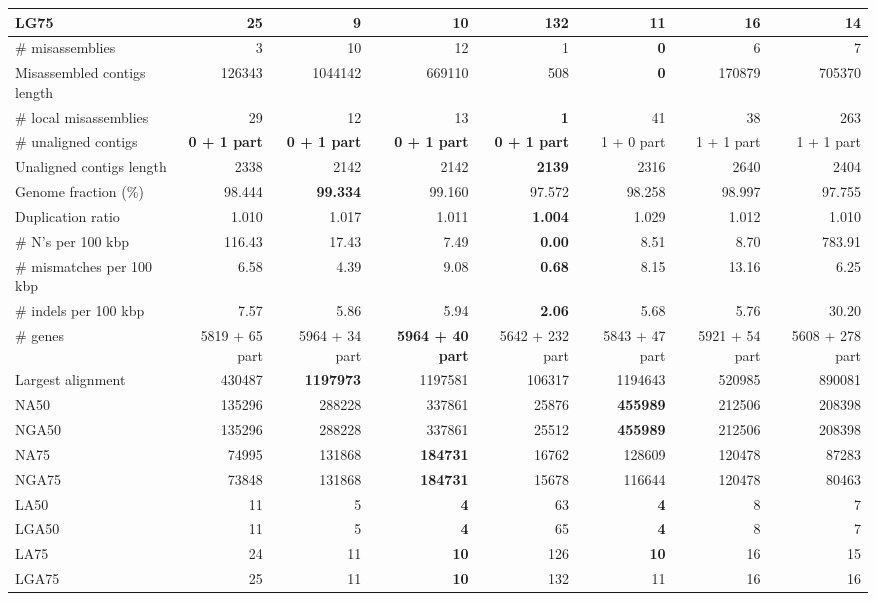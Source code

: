 \documentclass[12pt,a4paper]{article}
\begin{document}
\begin{table}[ht]
\begin{center}
\begin{tabular}{|l*{7}{|r}|}
LG75 & 25 & {\bf 9} & 10 & 132 & 11 & 16 & 14 \\ \hline
\# misassemblies & 3 & 10 & 12 & 1 & {\bf 0} & 6 & 7 \\ \hline
Misassembled contigs length & 126343 & 1044142 & 669110 & 508 & {\bf 0} & 170879 & 705370 \\ \hline
\# local misassemblies & 29 & 12 & 13 & {\bf 1} & 41 & 38 & 263 \\ \hline
\# unaligned contigs & {\bf 0 + 1 part} & {\bf 0 + 1 part} & {\bf 0 + 1 part} & {\bf 0 + 1 part} & 1 + 0 part & 1 + 1 part & 1 + 1 part \\ \hline
Unaligned contigs length & 2338 & 2142 & 2142 & {\bf 2139} & 2316 & 2640 & 2404 \\ \hline
Genome fraction (\%) & 98.444 & {\bf 99.334} & 99.160 & 97.572 & 98.258 & 98.997 & 97.755 \\ \hline
Duplication ratio & 1.010 & 1.017 & 1.011 & {\bf 1.004} & 1.029 & 1.012 & 1.010 \\ \hline
\# N's per 100 kbp & 116.43 & 17.43 & 7.49 & {\bf 0.00} & 8.51 & 8.70 & 783.91 \\ \hline
\# mismatches per 100 kbp & 6.58 & 4.39 & 9.08 & {\bf 0.68} & 8.15 & 13.16 & 6.25 \\ \hline
\# indels per 100 kbp & 7.57 & 5.86 & 5.94 & {\bf 2.06} & 5.68 & 5.76 & 30.20 \\ \hline
\# genes & 5819 + 65 part & 5964 + 34 part & {\bf 5964 + 40 part} & 5642 + 232 part & 5843 + 47 part & 5921 + 54 part & 5608 + 278 part \\ \hline
Largest alignment & 430487 & {\bf 1197973} & 1197581 & 106317 & 1194643 & 520985 & 890081 \\ \hline
NA50 & 135296 & 288228 & 337861 & 25876 & {\bf 455989} & 212506 & 208398 \\ \hline
NGA50 & 135296 & 288228 & 337861 & 25512 & {\bf 455989} & 212506 & 208398 \\ \hline
NA75 & 74995 & 131868 & {\bf 184731} & 16762 & 128609 & 120478 & 87283 \\ \hline
NGA75 & 73848 & 131868 & {\bf 184731} & 15678 & 116644 & 120478 & 80463 \\ \hline
LA50 & 11 & 5 & {\bf 4} & 63 & {\bf 4} & 8 & 7 \\ \hline
LGA50 & 11 & 5 & {\bf 4} & 65 & {\bf 4} & 8 & 7 \\ \hline
LA75 & 24 & 11 & {\bf 10} & 126 & {\bf 10} & 16 & 15 \\ \hline
LGA75 & 25 & 11 & {\bf 10} & 132 & 11 & 16 & 16 \\ \hline
\end{tabular}
\end{center}
\end{table}
\end{document}
